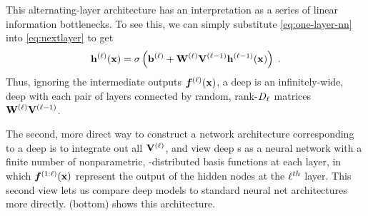 This alternating-layer architecture has an interpretation as a series of linear information bottlenecks.
To see this, we can simply substitute \cref{eq:one-layer-nn} into \cref{eq:nextlayer} to get
%
\begin{align}
{\bf{h}}^{(\ell)}({\bf{x}}) = \sigma \left( {\bf{b}}^{(\ell)} + \mathbf{W}^{(\ell)} \mathbf{V}^{(\ell-1)} {\bf{h}}^{(\ell-1)}({\bf{x}}) \right) \;.
\end{align}
%
Thus, ignoring the intermediate outputs $\boldsymbol{f}^{(\ell)}({\bf{x}})$, a deep \gp{} is an infinitely-wide, deep \MLP{} with each pair of layers connected by random, rank-$D_\ell$ matrices $\mathbf{W}^{(\ell)} \mathbf{V}^{(\ell-1)}$. %

The second, more direct way to construct a network architecture corresponding to a deep \gp{} is to integrate out all $\mathbf{V}^{(\ell)}$, and view deep \gp{}s as a neural network with a finite number of nonparametric, \gp{}-distributed basis functions at each layer, in which $\boldsymbol{f}^{(1:\ell)}({\bf{x}})$ represent the output of the hidden nodes at the $\ell^{th}$ layer.
This second view lets us compare deep \gp{} models to standard neural net architectures more directly.
(bottom) shows this architecture.





